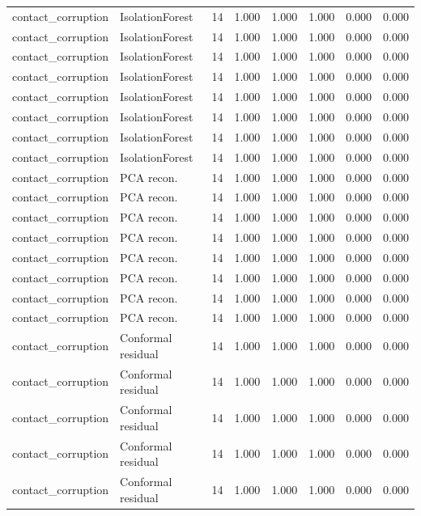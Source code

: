 {\begin{longtable}{llrrrrrr}
contact\_corruption & IsolationForest & 14 & 1.000 & 1.000 & 1.000 & 0.000 & 0.000 \\
contact\_corruption & IsolationForest & 14 & 1.000 & 1.000 & 1.000 & 0.000 & 0.000 \\
contact\_corruption & IsolationForest & 14 & 1.000 & 1.000 & 1.000 & 0.000 & 0.000 \\
contact\_corruption & IsolationForest & 14 & 1.000 & 1.000 & 1.000 & 0.000 & 0.000 \\
contact\_corruption & IsolationForest & 14 & 1.000 & 1.000 & 1.000 & 0.000 & 0.000 \\
contact\_corruption & IsolationForest & 14 & 1.000 & 1.000 & 1.000 & 0.000 & 0.000 \\
contact\_corruption & IsolationForest & 14 & 1.000 & 1.000 & 1.000 & 0.000 & 0.000 \\
contact\_corruption & IsolationForest & 14 & 1.000 & 1.000 & 1.000 & 0.000 & 0.000 \\
contact\_corruption & PCA recon. & 14 & 1.000 & 1.000 & 1.000 & 0.000 & 0.000 \\
contact\_corruption & PCA recon. & 14 & 1.000 & 1.000 & 1.000 & 0.000 & 0.000 \\
contact\_corruption & PCA recon. & 14 & 1.000 & 1.000 & 1.000 & 0.000 & 0.000 \\
contact\_corruption & PCA recon. & 14 & 1.000 & 1.000 & 1.000 & 0.000 & 0.000 \\
contact\_corruption & PCA recon. & 14 & 1.000 & 1.000 & 1.000 & 0.000 & 0.000 \\
contact\_corruption & PCA recon. & 14 & 1.000 & 1.000 & 1.000 & 0.000 & 0.000 \\
contact\_corruption & PCA recon. & 14 & 1.000 & 1.000 & 1.000 & 0.000 & 0.000 \\
contact\_corruption & PCA recon. & 14 & 1.000 & 1.000 & 1.000 & 0.000 & 0.000 \\
contact\_corruption & Conformal residual & 14 & 1.000 & 1.000 & 1.000 & 0.000 & 0.000 \\
contact\_corruption & Conformal residual & 14 & 1.000 & 1.000 & 1.000 & 0.000 & 0.000 \\
contact\_corruption & Conformal residual & 14 & 1.000 & 1.000 & 1.000 & 0.000 & 0.000 \\
contact\_corruption & Conformal residual & 14 & 1.000 & 1.000 & 1.000 & 0.000 & 0.000 \\
contact\_corruption & Conformal residual & 14 & 1.000 & 1.000 & 1.000 & 0.000 & 0.000 \\

\end{longtable}}
